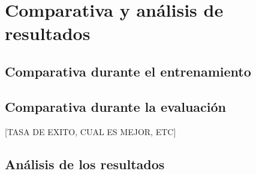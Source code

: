 \section{Comparativa y análisis de resultados}

\subsection{Comparativa durante el entrenamiento}

\subsection{Comparativa durante la evaluación}
[TASA DE EXITO, CUAL ES MEJOR, ETC]

\subsection{Análisis de los resultados}